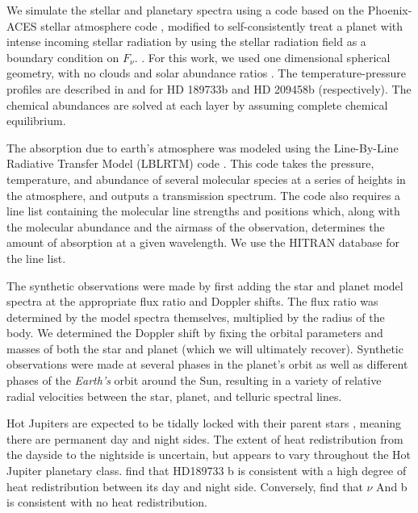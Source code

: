  We simulate the stellar and planetary spectra using a code based
on the Phoenix-ACES stellar atmosphere code \citep[described in][]{Barman2011}, modified to self-consistently treat a planet with intense incoming stellar radiation by using the stellar radiation field as a boundary condition on $F_{\nu}$.  \citep{Barman2001}. For this work, we used one dimensional spherical geometry, with no clouds and solar abundance ratios \citep{Asplund2005}. The temperature-pressure profiles are described in \cite{Barman2008} and \cite{Barman2002} for HD 189733b and HD 209458b (respectively). The chemical abundances are solved at each layer by assuming complete chemical equilibrium.

The absorption due to earth's atmosphere was modeled using the Line-By-Line Radiative Transfer Model (LBLRTM)
code \citep{Clough2005}. This code takes the pressure, temperature,
and abundance of several molecular species at a series of heights in
the atmosphere, and outputs a transmission spectrum. The code also
requires a line list containing the molecular
line strengths and positions which, along with the molecular abundance and the airmass of the observation,
determines the amount of absorption at a given wavelength. We use the HITRAN database \citep{Rothman2009} for the line
list.

The synthetic observations were made by first adding the star and
planet model spectra at the appropriate flux ratio and
Doppler shifts. The flux ratio was determined by the model
spectra themselves, multiplied by the radius of the body. We determined the Doppler shift by fixing the orbital parameters and masses of both the star and planet (which we will ultimately recover). Synthetic observations were made at
several phases in the planet's orbit as well as different phases of the \emph{Earth's} orbit around the Sun, resulting in a variety of relative radial velocities between the star, planet, and telluric spectral lines. 

Hot Jupiters are expected to be tidally locked with their parent stars
\citep{Fabrycky2010}, meaning there are permanent day and night sides. The extent
of heat redistribution from the dayside to the nightside is uncertain, 
but appears to vary throughout
the Hot Jupiter planetary class. \cite{Knutson2007_2} find that
HD189733 b is consistent with a high degree of heat redistribution
between its day and night side. Conversely, \cite{Harrington2006} find
that $\nu$ And b is consistent with no heat redistribution. 

